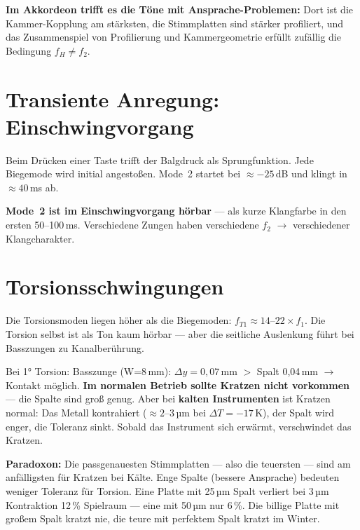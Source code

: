 \documentclass[11pt,a4paper]{article}
\begin{document}
\begin{tcolorbox}[colframe=keygreen, colback=green!5!white]
\textbf{Im Akkordeon trifft es die Töne mit Ansprache-Problemen:}
Dort ist die Kammer-Kopplung am stärksten, die Stimmplatten sind stärker
profiliert, und das Zusammenspiel von Profilierung und Kammergeometrie
erfüllt zufällig die Bedingung $f_H \neq f_2$.
\end{tcolorbox}

\section{Transiente Anregung: Einschwingvorgang}

Beim Drücken einer Taste trifft der Balgdruck als Sprungfunktion.
Jede Biegemode wird initial angestoßen.
Mode~2 startet bei $\approx -25$\,dB und klingt in $\approx 40$\,ms ab.

\begin{tcolorbox}[colframe=keygreen, colback=green!5!white]
\textbf{Mode~2 ist im Einschwingvorgang hörbar} --- als kurze Klangfarbe
in den ersten 50--100\,ms. Verschiedene Zungen haben verschiedene $f_2$
$\to$ verschiedener Klangcharakter.
\end{tcolorbox}

\section{Torsionsschwingungen}

Die Torsionsmoden liegen höher als die Biegemoden: $f_{T1} \approx 14$--$22 \times f_1$.
Die Torsion selbst ist als Ton kaum hörbar --- aber die seitliche Auslenkung
führt bei Basszungen zu Kanalberührung.

Bei 1° Torsion: Basszunge (W=8\,mm): $\Delta y = 0{,}07$\,mm $>$ Spalt 0,04\,mm
$\to$ Kontakt möglich. \textbf{Im normalen Betrieb sollte Kratzen nicht vorkommen} ---
die Spalte sind groß genug. Aber bei \textbf{kalten Instrumenten} ist Kratzen normal:
Das Metall kontrahiert ($\approx 2$--$3$\,µm bei $\Delta T = -17$\,K),
der Spalt wird enger, die Toleranz sinkt. Sobald das Instrument sich erwärmt,
verschwindet das Kratzen.

\begin{tcolorbox}[colframe=keygreen, colback=green!5!white]
\textbf{Paradoxon:} Die passgenauesten Stimmplatten --- also die teuersten ---
sind am anfälligsten für Kratzen bei Kälte. Enge Spalte (bessere Ansprache)
bedeuten weniger Toleranz für Torsion. Eine Platte mit 25\,µm Spalt verliert
bei 3\,µm Kontraktion 12\,\% Spielraum --- eine mit 50\,µm nur 6\,\%.
Die billige Platte mit großem Spalt kratzt nie, die teure mit perfektem Spalt
kratzt im Winter.
\end{tcolorbox}
\end{document}
